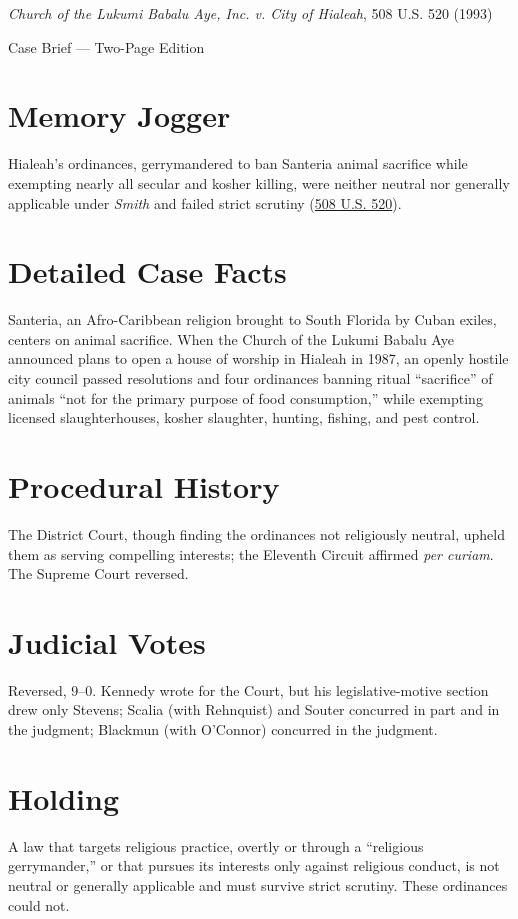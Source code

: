 \documentclass[12pt]{article}
\begin{document}
\begin{center}
{\LARGE \textit{Church of the Lukumi Babalu Aye, Inc. v. City of Hialeah}, 508 U.S. 520 (1993)\par}
\vspace{0.5em}
{\large Case Brief --- Two-Page Edition\par}
\end{center}

\section{Memory Jogger}
Hialeah's ordinances, gerrymandered to ban Santeria animal sacrifice while exempting nearly all secular and kosher killing, were neither neutral nor generally applicable under \textit{Smith} and failed strict scrutiny (\href{https://supreme.justia.com/cases/federal/us/508/520/}{508 U.S. 520}).

\section{Detailed Case Facts}
Santeria, an Afro-Caribbean religion brought to South Florida by Cuban exiles, centers on animal sacrifice. When the Church of the Lukumi Babalu Aye announced plans to open a house of worship in Hialeah in 1987, an openly hostile city council passed resolutions and four ordinances banning ritual ``sacrifice'' of animals ``not for the primary purpose of food consumption,'' while exempting licensed slaughterhouses, kosher slaughter, hunting, fishing, and pest control.

\section{Procedural History}
The District Court, though finding the ordinances not religiously neutral, upheld them as serving compelling interests; the Eleventh Circuit affirmed \textit{per curiam}. The Supreme Court reversed.

\section{Judicial Votes}
Reversed, 9--0. Kennedy wrote for the Court, but his legislative-motive section drew only Stevens; Scalia (with Rehnquist) and Souter concurred in part and in the judgment; Blackmun (with O'Connor) concurred in the judgment.

\section{Holding}
A law that targets religious practice, overtly or through a ``religious gerrymander,'' or that pursues its interests only against religious conduct, is not neutral or generally applicable and must survive strict scrutiny. These ordinances could not.
\end{document}
